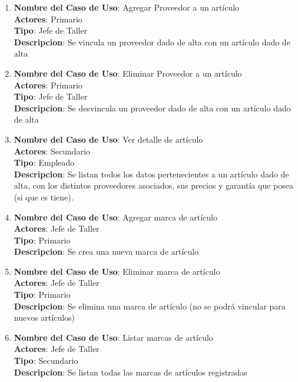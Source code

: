 \documentclass[12pt]{extarticle}
\begin{document}
\begin{spacing}{1.2}
\begin{enumerate}
            \item 	\textbf{Nombre del Caso de Uso}: Agregar Proveedor a un artículo\\
                    \textbf{Actores}: Primario\\
                    \textbf{Tipo}: Jefe de Taller\\
                    \textbf{Descripcion}: Se vincula un proveedor dado de alta con un artículo dado de alta

            \item 	\textbf{Nombre del Caso de Uso}: Eliminar Proveedor a un artículo\\
                    \textbf{Actores}: Primario\\
                    \textbf{Tipo}: Jefe de Taller\\
                    \textbf{Descripcion}: Se desvincula un proveedor dado de alta con un artículo dado de alta

            \item 	\textbf{Nombre del Caso de Uso}: Ver detalle de artículo\\
                    \textbf{Actores}: Secundario\\
                    \textbf{Tipo}: Empleado\\
                    \textbf{Descripcion}: Se listan todos los datos pertenecientes a un artículo dado de alta, con los distintos proveedores asociados, sus precios y garantía que posea (si que es tiene).

            \item 	\textbf{Nombre del Caso de Uso}: Agregar marca de artículo\\
                    \textbf{Actores}: Jefe de Taller\\
                    \textbf{Tipo}: Primario\\
                    \textbf{Descripcion}: Se crea una nueva marca de artículo

            \item 	\textbf{Nombre del Caso de Uso}: Eliminar marca de artículo\\
                    \textbf{Actores}: Jefe de Taller\\
                    \textbf{Tipo}: Primario\\
                    \textbf{Descripcion}: Se elimina una marca de artículo (no se podrá vincular para nuevos artículos)

            \item 	\textbf{Nombre del Caso de Uso}: Listar marcas de artículo\\
                    \textbf{Actores}: Jefe de Taller\\
                    \textbf{Tipo}: Secundario\\
                    \textbf{Descripcion}: Se listan todas las marcas de artículos registradas	




\end{enumerate}
\end{spacing}
\end{document}
